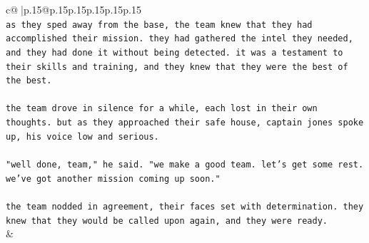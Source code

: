 \documentclass{article}
\begin{document}
{\begin{supertabular}{c@{$\;$}|p{.15\linewidth}@{}p{.15\linewidth}p{.15\linewidth}p{.15\linewidth}p{.15\linewidth}p{.15\linewidth}}
{{{\\ 
\texttt{as they sped away from the base, the team knew that they had accomplished their mission. they had gathered the intel they needed, and they had done it without being detected. it was a testament to their skills and training, and they knew that they were the best of the best.} \\
\\ 
\texttt{the team drove in silence for a while, each lost in their own thoughts. but as they approached their safe house, captain jones spoke up, his voice low and serious.} \\
\\ 
\texttt{"well done, team," he said. "we make a good team. let's get some rest. we've got another mission coming up soon."} \\
\\ 
\texttt{the team nodded in agreement, their faces set with determination. they knew that they would be called upon again, and they were ready.} \\
            }
        }
    }
    & \\ \\


\end{supertabular}}
\end{document}
